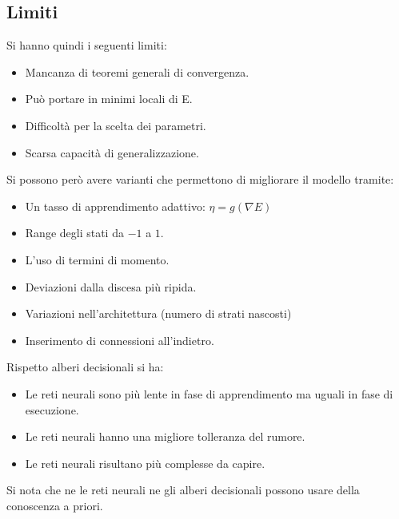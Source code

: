 \subsection{Limiti}
Si hanno quindi i seguenti limiti:
\begin{itemize}
    \item Mancanza di teoremi generali di convergenza.
    \item Può portare in minimi locali di E.
    \item Difficoltà per la scelta dei parametri.
    \item Scarsa capacità di generalizzazione.
\end{itemize}
Si possono però avere varianti che permettono di migliorare il modello tramite:
\begin{itemize}
    \item Un tasso di apprendimento adattivo: $\eta = g(\nabla E)$
    \item Range degli stati da $-1$ a $1$.
    \item L'uso di termini di momento.
    \item Deviazioni dalla discesa più ripida.
    \item Variazioni nell'architettura (numero di strati nascosti)
    \item Inserimento di connessioni all'indietro.
\end{itemize}

\begin{osservazione}
    Rispetto alberi decisionali si ha:
    \begin{itemize}
        \item Le reti neurali sono più lente in fase di apprendimento ma uguali
              in fase di esecuzione.
        \item Le reti neurali hanno una migliore tolleranza del rumore.
        \item Le reti neurali risultano più complesse da capire.
    \end{itemize}

    Si nota che ne le reti neurali ne gli alberi decisionali possono usare della
    conoscenza a priori.
\end{osservazione}